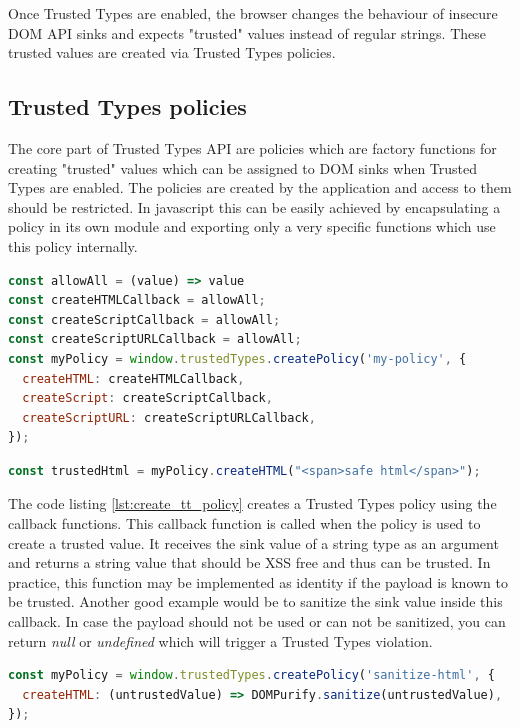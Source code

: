 Once Trusted Types are enabled, the browser changes the behaviour of insecure DOM API sinks and
expects "trusted" values instead of regular strings. These trusted values are created via Trusted
Types policies.

\subsection{Trusted Types policies}
\label{subsec:tt_policy}

The core part of Trusted Types API are policies which are factory functions for creating "trusted"
values which can be assigned to DOM sinks when Trusted Types are enabled. The policies are created
by the application and access to them should be restricted. In javascript this can be easily
achieved by encapsulating a policy in its own module and exporting only a very specific functions
which use this policy internally.

\bigskip
\begin{lstlisting}[language=JavaScript, caption=Creating a Trusted Types policy, label={lst:create_tt_policy}]
const allowAll = (value) => value
const createHTMLCallback = allowAll;
const createScriptCallback = allowAll;
const createScriptURLCallback = allowAll;
const myPolicy = window.trustedTypes.createPolicy('my-policy', {
  createHTML: createHTMLCallback,
  createScript: createScriptCallback,
  createScriptURL: createScriptURLCallback,
});
\end{lstlisting}

\bigskip
\begin{lstlisting}[language=JavaScript, caption=Create trusted value using a policy]
const trustedHtml = myPolicy.createHTML("<span>safe html</span>");
\end{lstlisting}

The code listing \ref{lst:create_tt_policy} creates a Trusted Types policy using the callback
functions. This callback function is called when the policy is used to create a trusted value. It
receives the sink value of a string type as an argument and returns a string value that should be
XSS free and thus can be trusted. In practice, this function may be implemented as identity if the
payload is known to be trusted. Another good example would be to sanitize the sink value inside this
callback. In case the payload should not be used or can not be sanitized, you can return
\textit{null} or \textit{undefined} which will trigger a Trusted Types violation.

\bigskip
\begin{lstlisting}[language=JavaScript, caption=Using a policy to sanitize HTML values]
const myPolicy = window.trustedTypes.createPolicy('sanitize-html', {
  createHTML: (untrustedValue) => DOMPurify.sanitize(untrustedValue),
});
\end{lstlisting}

